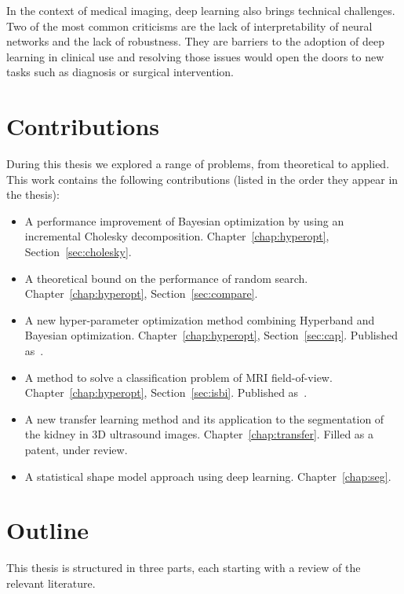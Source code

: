 In the context of medical imaging, deep learning also brings technical challenges. Two of the most common criticisms are the lack of interpretability of neural networks and the lack of robustness. They are barriers to the adoption of deep learning in clinical use and resolving those issues would open the doors to new tasks such as diagnosis or surgical intervention. 

\section{Contributions}

During this thesis we explored a range of problems, from theoretical to applied. This work contains the following contributions (listed in the order they appear in the thesis):
\begin{itemize}
    \item A performance improvement of Bayesian optimization by using an incremental Cholesky decomposition. Chapter~\ref{chap:hyperopt}, Section~\ref{sec:cholesky}.
    \item A theoretical bound on the performance of random search. Chapter~\ref{chap:hyperopt}, Section~\ref{sec:compare}.
    \item A new hyper-parameter optimization method combining Hyperband and Bayesian optimization. Chapter~\ref{chap:hyperopt}, Section~\ref{sec:cap}. Published as~\textcite{bertrand2017CAp}.
    \item A method to solve a classification problem of MRI field-of-view. Chapter~\ref{chap:hyperopt}, Section~\ref{sec:isbi}. Published as~\textcite{bertrand2017ISBI}.
    \item A new transfer learning method and its application to the segmentation of the kidney in 3D ultrasound images. Chapter~\ref{chap:transfer}. Filled as a patent, under review.
    \item A statistical shape model approach using deep learning. Chapter~\ref{chap:seg}.
\end{itemize}

\section{Outline}

This thesis is structured in three parts, each starting with a review of the relevant literature.

